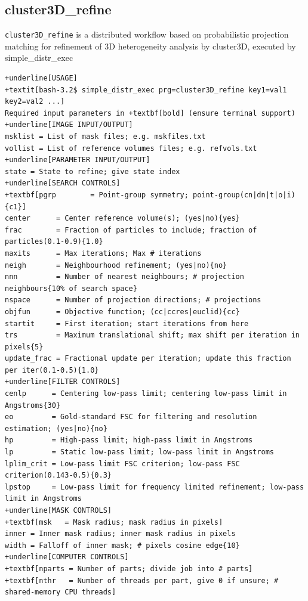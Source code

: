 \documentclass[a4paper,11pt]{article}
\newcommand{\prgname}[1]{\textcolor{NavyBlue}{\texttt{#1}}}
\begin{document}
\subsection{cluster3D\_refine}
\label{cluster3D_refine}
\prgname{cluster3D\_refine} is a distributed workflow based on probabilistic projection matching for refinement of 3D heterogeneity analysis by cluster3D, executed by simple\_distr\_exec
\begin{Verbatim}[commandchars=+\[\],fontsize=\small,breaklines=true]
+underline[USAGE]
+textit[bash-3.2$ simple_distr_exec prg=cluster3D_refine key1=val1 key2=val2 ...]
Required input parameters in +textbf[bold] (ensure terminal support)
+underline[IMAGE INPUT/OUTPUT]
msklist = List of mask files; e.g. mskfiles.txt
vollist = List of reference volumes files; e.g. refvols.txt
+underline[PARAMETER INPUT/OUTPUT]
state = State to refine; give state index
+underline[SEARCH CONTROLS]
+textbf[pgrp        = Point-group symmetry; point-group(cn|dn|t|o|i){c1}]
center      = Center reference volume(s); (yes|no){yes}
frac        = Fraction of particles to include; fraction of particles(0.1-0.9){1.0}
maxits      = Max iterations; Max # iterations
neigh       = Neighbourhood refinement; (yes|no){no}
nnn         = Number of nearest neighbours; # projection neighbours{10% of search space}
nspace      = Number of projection directions; # projections
objfun      = Objective function; (cc|ccres|euclid){cc}
startit     = First iteration; start iterations from here
trs         = Maximum translational shift; max shift per iteration in pixels{5}
update_frac = Fractional update per iteration; update this fraction per iter(0.1-0.5){1.0}
+underline[FILTER CONTROLS]
cenlp      = Centering low-pass limit; centering low-pass limit in Angstroms{30}
eo         = Gold-standard FSC for filtering and resolution estimation; (yes|no){no}
hp         = High-pass limit; high-pass limit in Angstroms
lp         = Static low-pass limit; low-pass limit in Angstroms
lplim_crit = Low-pass limit FSC criterion; low-pass FSC criterion(0.143-0.5){0.3}
lpstop     = Low-pass limit for frequency limited refinement; low-pass limit in Angstroms
+underline[MASK CONTROLS]
+textbf[msk   = Mask radius; mask radius in pixels]
inner = Inner mask radius; inner mask radius in pixels
width = Falloff of inner mask; # pixels cosine edge{10}
+underline[COMPUTER CONTROLS]
+textbf[nparts = Number of parts; divide job into # parts]
+textbf[nthr   = Number of threads per part, give 0 if unsure; # shared-memory CPU threads]
\end{Verbatim}
\end{document}
